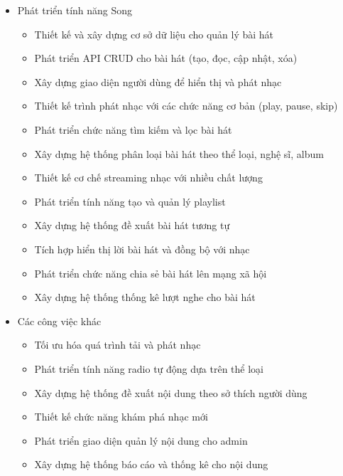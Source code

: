 \begin{itemize}
    \item Phát triển tính năng Song
    \begin{itemize}
        \item Thiết kế và xây dựng cơ sở dữ liệu cho quản lý bài hát
        \item Phát triển API CRUD cho bài hát (tạo, đọc, cập nhật, xóa)
        \item Xây dựng giao diện người dùng để hiển thị và phát nhạc
        \item Thiết kế trình phát nhạc với các chức năng cơ bản (play, pause, skip)
        \item Phát triển chức năng tìm kiếm và lọc bài hát
        \item Xây dựng hệ thống phân loại bài hát theo thể loại, nghệ sĩ, album
        \item Thiết kế cơ chế streaming nhạc với nhiều chất lượng
        \item Phát triển tính năng tạo và quản lý playlist
        \item Xây dựng hệ thống đề xuất bài hát tương tự
        \item Tích hợp hiển thị lời bài hát và đồng bộ với nhạc
        \item Phát triển chức năng chia sẻ bài hát lên mạng xã hội
        \item Xây dựng hệ thống thống kê lượt nghe cho bài hát
    \end{itemize}
    
    \item Các công việc khác
    \begin{itemize}
        \item Tối ưu hóa quá trình tải và phát nhạc
        \item Phát triển tính năng radio tự động dựa trên thể loại
        \item Xây dựng hệ thống đề xuất nội dung theo sở thích người dùng
        \item Thiết kế chức năng khám phá nhạc mới
        \item Phát triển giao diện quản lý nội dung cho admin
        \item Xây dựng hệ thống báo cáo và thống kê cho nội dung
    \end{itemize}
\end{itemize}

